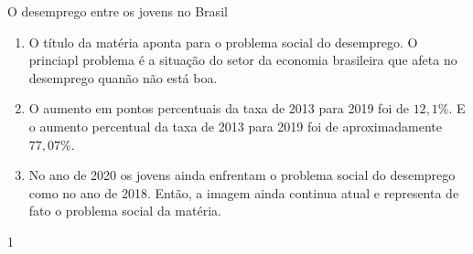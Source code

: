 \begin{resposta}{O desemprego entre os jovens no Brasil}
{\begin{enumerate}
    \item O título da matéria aponta para o problema social do desemprego. O princiapl problema é a situação do setor da economia brasileira que afeta no desemprego quanão não está boa.
    \item O aumento em pontos percentuais da taxa de 2013 para 2019 foi de $12{,}1$\%. E o aumento percentual da taxa de 2013 para 2019 foi de aproximadamente $77{,}07$\%.
    \item No ano de 2020 os jovens ainda enfrentam o problema social do desemprego como no ano de 2018. Então, a imagem ainda continua atual e representa de fato o problema social da matéria.
  \end{enumerate}}{1}
\end{resposta}


